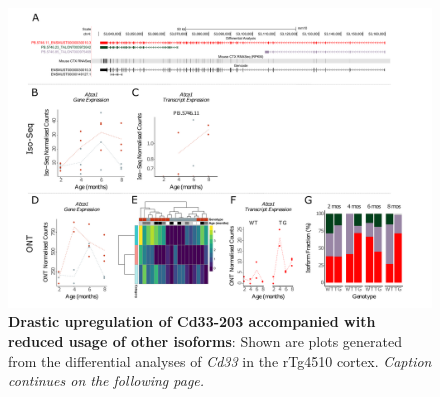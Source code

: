 \begin{landscape}
	\begin{figure}[htp]
		\begin{center}
			\includegraphics[page=7,trim={0 0.5cm 0 1.5cm},scale =0.85]{Figures/TargetGene_DifferentialAnalysis.pdf}
		\end{center}
		\captionsetup{width=1.5\textwidth}
		\caption[Differential \textit{Cd33} transcript expression and usage]%
		{\textbf{Drastic upregulation of Cd33-203 accompanied with reduced usage of other isoforms}: Shown are plots generated from the differential analyses of \textit{Cd33} in the rTg4510 cortex. \textit{Caption continues on the following page.}}   
		\label{fig:cd33_diff_analysis}
	\end{figure}
\end{landscape}
